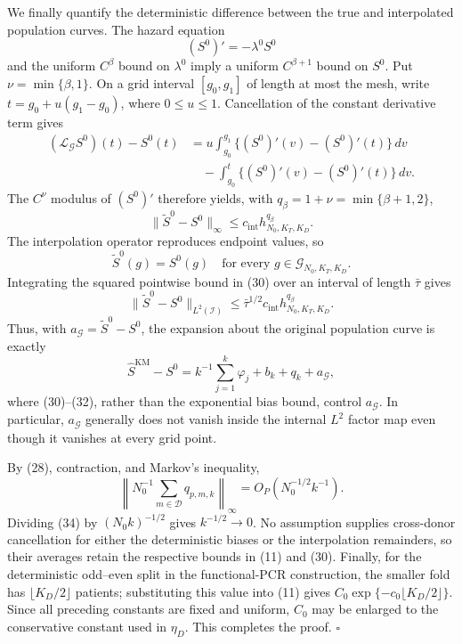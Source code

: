 We finally quantify the deterministic difference between the true and interpolated population curves.  The hazard equation
\[
 (S^0)'=-\lambda^0S^0
\]
and the uniform \(C^\beta\) bound on \(\lambda^0\) imply a uniform \(C^{\beta+1}\) bound on \(S^0\).  Put \(\nu=\min\{\beta,1\}\).  On a grid interval \([g_0,g_1]\) of length at most the mesh, write \(t=g_0+u(g_1-g_0)\), where \(0\le u\le1\).  Cancellation of the constant derivative term gives
\[
 \begin{aligned}
 (\mathcal L_{\mathcal G}S^0)(t)-S^0(t)
 &=u\int_{g_0}^{g_1}\{(S^0)'(v)-(S^0)'(t)\}\,dv\\
 &\quad-\int_{g_0}^{t}\{(S^0)'(v)-(S^0)'(t)\}\,dv.
 \end{aligned}
\]
The \(C^\nu\) modulus of \((S^0)'\) therefore yields, with \(q_\beta=1+\nu=\min\{\beta+1,2\}\),
\[
 \|\widetilde S^0-S^0\|_\infty
 \le c_{\mathrm{int}}h_{N_0,K_T,K_D}^{q_\beta}.              \tag{30}
\]
The interpolation operator reproduces endpoint values, so
\[
 \widetilde S^0(g)=S^0(g)
 \quad\text{for every }g\in\mathcal G_{N_0,K_T,K_D}.         \tag{31}
\]
Integrating the squared pointwise bound in (30) over an interval of length \(\bar\tau\) gives
\[
 \|\widetilde S^0-S^0\|_{L^2(\mathcal I)}
 \le \bar\tau^{1/2}c_{\mathrm{int}}
 h_{N_0,K_T,K_D}^{q_\beta}.                                  \tag{32}
\]
Thus, with \(a_{\mathcal G}=\widetilde S^0-S^0\), the expansion about the original population curve is exactly
\[
 \widehat S^{\mathrm{KM}}-S^0
 =k^{-1}\sum_{j=1}^k\varphi_j+b_k+q_k+a_{\mathcal G},        \tag{33}
\]
where (30)--(32), rather than the exponential bias bound, control \(a_{\mathcal G}\).  In particular, \(a_{\mathcal G}\) generally does not vanish inside the internal \(L^2\) factor map even though it vanishes at every grid point.

By (28), contraction, and Markov's inequality,
\[
 \left\|N_0^{-1}\sum_{m\in\mathcal D}q_{p,m,k}\right\|_\infty
 =O_P(N_0^{-1/2}k^{-1}).                                    \tag{34}
\]
Dividing (34) by \((N_0k)^{-1/2}\) gives \(k^{-1/2}\to0\).  No assumption supplies cross-donor cancellation for either the deterministic biases or the interpolation remainders, so their averages retain the respective bounds in (11) and (30).  Finally, for the deterministic odd--even split in the functional-PCR construction, the smaller fold has \(\lfloor K_D/2\rfloor\) patients; substituting this value into (11) gives \(C_0\exp\{-c_0\lfloor K_D/2\rfloor\}\).  Since all preceding constants are fixed and uniform, \(C_0\) may be enlarged to the conservative constant used in \(\eta_D\).  This completes the proof. \(\square\)